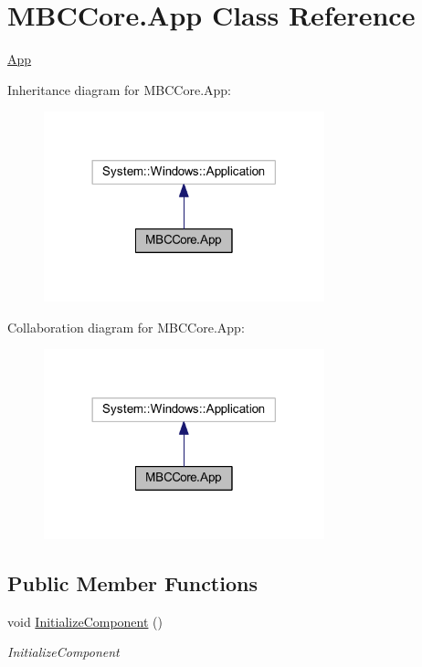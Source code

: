 \hypertarget{class_m_b_c_core_1_1_app}{\section{M\-B\-C\-Core.\-App Class Reference}
\label{class_m_b_c_core_1_1_app}
}


\hyperlink{class_m_b_c_core_1_1_app}{App}  




Inheritance diagram for M\-B\-C\-Core.\-App\-:
\nopagebreak
\begin{figure}[H]
\begin{center}
\leavevmode
\includegraphics[width=230pt]{class_m_b_c_core_1_1_app__inherit__graph}
\end{center}
\end{figure}


Collaboration diagram for M\-B\-C\-Core.\-App\-:
\nopagebreak
\begin{figure}[H]
\begin{center}
\leavevmode
\includegraphics[width=230pt]{class_m_b_c_core_1_1_app__coll__graph}
\end{center}
\end{figure}
\subsection*{Public Member Functions}
\begin{DoxyCompactItemize}
\item 
void \hyperlink{class_m_b_c_core_1_1_app_a81f1c640188491a32234ebd798325f64}{Initialize\-Component} ()
\begin{DoxyCompactList}\small\item\em Initialize\-Component \end{DoxyCompactList}\end{DoxyCompactItemize}
